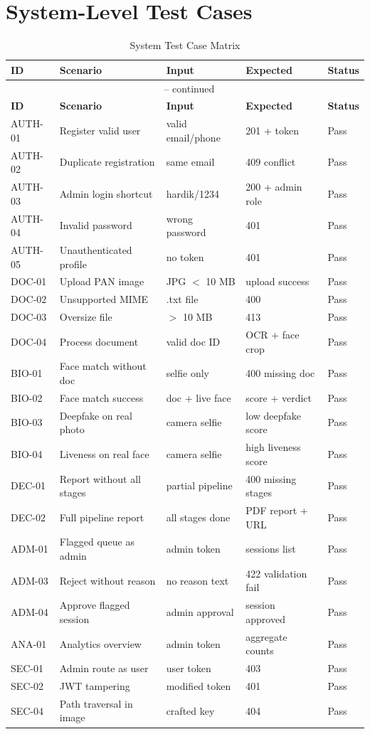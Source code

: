 \section{System-Level Test Cases}

\begin{longtable}{@{}p{1.5cm}p{4.5cm}p{3cm}p{2.5cm}p{2cm}@{}}
\caption{System Test Case Matrix} \\
\toprule
\textbf{ID} & \textbf{Scenario} & \textbf{Input} & \textbf{Expected} & \textbf{Status} \\
\midrule
\endfirsthead
\multicolumn{5}{c}{\tablename\ \thetable{} -- continued} \\
\toprule
\textbf{ID} & \textbf{Scenario} & \textbf{Input} & \textbf{Expected} & \textbf{Status} \\
\midrule
\endhead
AUTH-01 & Register valid user & valid email/phone & 201 + token & Pass \\
AUTH-02 & Duplicate registration & same email & 409 conflict & Pass \\
AUTH-03 & Admin login shortcut & hardik/1234 & 200 + admin role & Pass \\
AUTH-04 & Invalid password & wrong password & 401 & Pass \\
AUTH-05 & Unauthenticated profile & no token & 401 & Pass \\
DOC-01 & Upload PAN image & JPG $<$ 10 MB & upload success & Pass \\
DOC-02 & Unsupported MIME & .txt file & 400 & Pass \\
DOC-03 & Oversize file & $>$ 10 MB & 413 & Pass \\
DOC-04 & Process document & valid doc ID & OCR + face crop & Pass \\
BIO-01 & Face match without doc & selfie only & 400 missing doc & Pass \\
BIO-02 & Face match success & doc + live face & score + verdict & Pass \\
BIO-03 & Deepfake on real photo & camera selfie & low deepfake score & Pass \\
BIO-04 & Liveness on real face & camera selfie & high liveness score & Pass \\
DEC-01 & Report without all stages & partial pipeline & 400 missing stages & Pass \\
DEC-02 & Full pipeline report & all stages done & PDF report + URL & Pass \\
ADM-01 & Flagged queue as admin & admin token & sessions list & Pass \\
ADM-03 & Reject without reason & no reason text & 422 validation fail & Pass \\
ADM-04 & Approve flagged session & admin approval & session approved & Pass \\
ANA-01 & Analytics overview & admin token & aggregate counts & Pass \\
SEC-01 & Admin route as user & user token & 403 & Pass \\
SEC-02 & JWT tampering & modified token & 401 & Pass \\
SEC-04 & Path traversal in image & crafted key & 404 & Pass \\
\bottomrule
\end{longtable}

